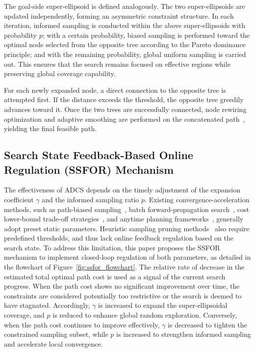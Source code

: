\documentclass[sn-mathphys-num]{sn-jnl}%
\begin{document}
The goal-side super-ellipsoid is defined analogously. The two super-ellipsoids are updated independently, forming an asymmetric constraint structure. In each iteration, informed sampling is conducted within the above super-ellipsoids with probability $p$; with a certain probability, biased sampling is performed toward the optimal node selected from the opposite tree according to the Pareto dominance principle; and with the remaining probability, global uniform sampling is carried out. This ensures that the search remains focused on effective regions while preserving global coverage capability.



For each newly expanded node, a direct connection to the opposite tree is attempted first. If the distance exceeds the threshold, the opposite tree greedily advances toward it. Once the two trees are successfully connected, node rewiring optimization and adaptive smoothing are performed on the concatenated path~\cite{ravankar2018path,yang2010analytical}, yielding the final feasible path.



\subsection{Search State Feedback-Based Online Regulation (SSFOR) Mechanism}\label{subsec3}

The effectiveness of ADCS depends on the timely adjustment of the expansion coefficient $\gamma$ and the informed sampling ratio $p$. Existing convergence-acceleration methods, such as path-biased sampling~\cite{nasir2013rrt}, batch forward-propagation search~\cite{janson2015fast}, cost lower-bound trade-off strategies~\cite{salzman2016asymptotically}, and anytime planning frameworks~\cite{ferguson2006anytime,karaman2011anytime}, generally adopt preset static parameters. Heuristic sampling pruning methods~\cite{akgun2011sampling} also require predefined thresholds, and thus lack online feedback regulation based on the search state. To address this limitation, this paper proposes the SSFOR mechanism to implement closed-loop regulation of both parameters, as detailed in the flowchart of Figure~\ref{fig:ssfor_flowchart}. The relative rate of decrease in the estimated total optimal path cost is used as a signal of the current search progress. When the path cost shows no significant improvement over time, the constraints are considered potentially too restrictive or the search is deemed to have stagnated. Accordingly, $\gamma$ is increased to expand the super-ellipsoidal coverage, and $p$ is reduced to enhance global random exploration. Conversely, when the path cost continues to improve effectively, $\gamma$ is decreased to tighten the constrained sampling subset, while $p$ is increased to strengthen informed sampling and accelerate local convergence.
\end{document}
